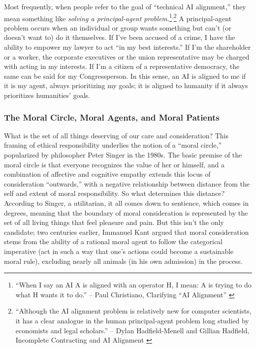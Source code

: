 \documentclass[letterpaper]{article} %
\begin{document}
Most frequently, when people refer to the goal of ``technical AI alignment,'' they mean something like \emph{solving a principal-agent problem}.\footnote{``When I say an AI A is aligned with an operator H, I mean: A is trying to do what H wants it to do.'' -- Paul Christiano, Clarifying ``AI Alignment'' \citep{christiano_clarifying}}\textsuperscript{,}\footnote{``Although the AI alignment problem is relatively new for computer scientists, it has a clear analogue in the human principal-agent problem long studied by economists and legal scholars.'' -- Dylan Hadfield-Menell and Gillian Hadfield, Incomplete Contracting and AI Alignment \citep{hadfieldmenell_incomplete}} A principal-agent problem occurs when an individual or group wants something but can't (or doesn't want to) do it themselves. If I've been accused of a crime, I have the ability to empower my lawyer to act ``in my best interests.'' If I'm the shareholder or a worker, the corporate executives or the union representative may be charged with acting in my interests. If I'm a citizen of a representative democracy, the same can be said for my Congressperson. In this sense, an AI is aligned to me if it is my agent, always prioritizing my goals; it is aligned to humanity if it always prioritizes humanities' goals.

\subsubsection{The Moral Circle, Moral Agents, and Moral Patients}

What is the set of all things deserving of our care and consideration? This framing of ethical responsibility underlies the notion of a ``moral circle,'' \citep{singer_expanding} popularized by philosopher Peter Singer in the 1980s. The basic premise of the moral circle is that everyone recognizes the value of her or himself, and a combination of affective and cognitive empathy extends this locus of consideration ``outwards,'' with a negative relationship between distance from the self and extent of moral responsibility. So what determines this distance? According to Singer, a utilitarian, it all comes down to sentience, which comes in degrees, meaning that the boundary of moral consideration is represented by the set of all living things that feel pleasure and pain. But this isn't the only candidate; two centuries earlier, Immanuel Kant argued that moral consideration stems from the ability of a rational moral agent to follow the categorical imperative \citep{sep_kant} (act in such a way that one's actions could become a sustainable moral rule), excluding nearly all animals (in his own admission) in the process.
\end{document}
